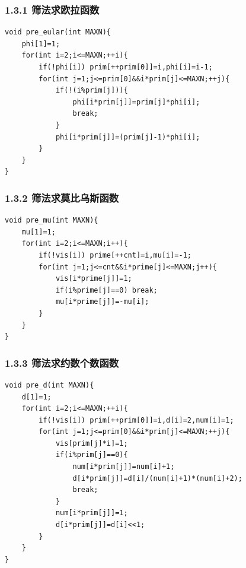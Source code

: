 \documentclass[UTF8,a4paper,11pt]{ctexart}
\begin{document}
\subsubsection*{1.3.1 筛法求欧拉函数}

\begin{Verbatim}[fontsize=\small,frame=single,breaklines=true,breakanywhere=true]
void pre_eular(int MAXN){
    phi[1]=1;
    for(int i=2;i<=MAXN;++i){
        if(!phi[i]) prim[++prim[0]]=i,phi[i]=i-1;
        for(int j=1;j<=prim[0]&&i*prim[j]<=MAXN;++j){
            if(!(i%prim[j])){
                phi[i*prim[j]]=prim[j]*phi[i];
                break;
            }
            phi[i*prim[j]]=(prim[j]-1)*phi[i];
        }
    }
}
\end{Verbatim}
\subsubsection*{1.3.2 筛法求莫比乌斯函数}

\begin{Verbatim}[fontsize=\small,frame=single,breaklines=true,breakanywhere=true]
void pre_mu(int MAXN){
    mu[1]=1;
    for(int i=2;i<=MAXN;i++){
        if(!vis[i]) prime[++cnt]=i,mu[i]=-1;
        for(int j=1;j<=cnt&&i*prime[j]<=MAXN;j++){
            vis[i*prime[j]]=1;
            if(i%prime[j]==0) break;
            mu[i*prime[j]]=-mu[i];
        }
    }
}
\end{Verbatim}
\subsubsection*{1.3.3 筛法求约数个数函数}

\begin{Verbatim}[fontsize=\small,frame=single,breaklines=true,breakanywhere=true]
void pre_d(int MAXN){
    d[1]=1;
    for(int i=2;i<=MAXN;++i){
        if(!vis[i]) prim[++prim[0]]=i,d[i]=2,num[i]=1;
        for(int j=1;j<=prim[0]&&i*prim[j]<=MAXN;++j){
            vis[prim[j]*i]=1;
            if(i%prim[j]==0){
                num[i*prim[j]]=num[i]+1;
                d[i*prim[j]]=d[i]/(num[i]+1)*(num[i]+2);
                break;
            }
            num[i*prim[j]]=1;
            d[i*prim[j]]=d[i]<<1;
        }
    }
}
\end{Verbatim}
\end{document}
